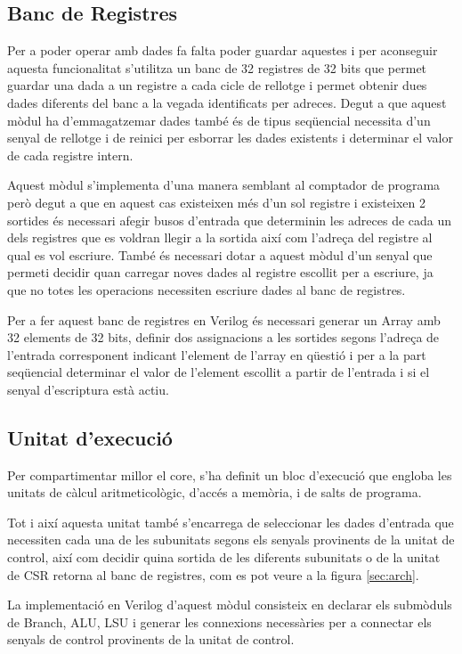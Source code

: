 \documentclass[10pt,a4paper,twocolumn,twoside]{article}
\begin{document}
    \subsection{Banc de Registres}
    Per a poder operar amb dades fa falta poder guardar aquestes i per aconseguir aquesta funcionalitat s'utilitza un banc de 32 registres de 32 bits que permet guardar una dada a un registre a cada cicle de rellotge i permet obtenir dues dades diferents del banc a la vegada identificats per adreces.
    Degut a que aquest mòdul ha d'emmagatzemar dades també és de tipus seqüencial necessita d'un senyal de rellotge i de reinici per esborrar les dades existents i determinar el valor de cada registre intern.
    
    Aquest mòdul s'implementa d'una manera semblant al comptador de programa però degut a que en aquest cas existeixen més d'un sol registre i existeixen 2 sortides és necessari afegir busos d'entrada que determinin les adreces de cada un dels registres que es voldran llegir a la sortida així com l'adreça del registre al qual es vol escriure. També és necessari dotar a aquest mòdul d'un senyal que permeti decidir quan carregar noves dades al registre escollit per a escriure, ja que no totes les operacions necessiten escriure dades al banc de registres. 
    
    Per a fer aquest banc de registres en Verilog és necessari generar un Array amb 32 elements de 32 bits, definir dos assignacions a les sortides segons l'adreça de l'entrada corresponent indicant l'element de l'array en qüestió i per a la part seqüencial determinar el valor de l'element escollit a partir de l'entrada i si el senyal d'escriptura està actiu.
    
    
    
    \subsection{Unitat d'execució}
    Per compartimentar millor el core, s'ha definit un bloc d'execució que engloba les unitats de càlcul aritmeticològic, d'accés a memòria, i de salts de programa.
    
    Tot i així aquesta unitat també s'encarrega de seleccionar les dades d'entrada que necessiten cada una de les subunitats segons els senyals provinents de la unitat de control, així com decidir quina sortida de les diferents subunitats o de la unitat de CSR retorna al banc de registres, com es pot veure a la figura \ref{sec:arch}.
    
    La implementació en Verilog d'aquest mòdul consisteix en declarar els submòduls de Branch, ALU, LSU i generar les connexions necessàries per a connectar els senyals de control provinents de la unitat de control. 
    
\end{document}
